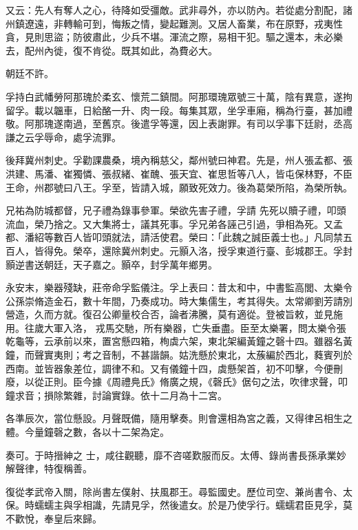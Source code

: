 \begin{pinyinscope}
 又云：先人有奪人之心，待降如受彊敵。武非尋外，亦以防內。若從處分割配，諸州鎮遼遠，非轉輸可到，悔叛之情，變起難測。又居人畜業，布在原野，戎夷性貪，見則思盜；防彼肅此，少兵不堪。渾流之際，易相干犯。驅之還本，未必樂去，配州內徙，復不肯從。既其如此，為費必大。



 朝廷不許。



 孚持白武幡勞阿那瑰於柔玄、懷荒二鎮間。阿那環瑰眾號三十萬，陰有異意，遂拘留孚。載以韞車，日給酪一升、肉一段。每集其眾，坐孚車廂，稱為行臺，甚加禮敬。阿那瑰遂南過，至舊京。後遣孚等還，因上表謝罪。有司以孚事下廷尉，丞高謙之云孚辱命，處孚流罪。



 後拜冀州刺史。孚勸課農桑，境內稱慈父，鄰州號曰神君。先是，州人張孟都、張洪建、馬潘、崔獨憐、張叔緒、崔醜、張天宜、崔思哲等八人，皆屯保林野，不臣王命，州郡號曰八王。孚至，皆請入城，願致死效力。後為葛榮所陷，為榮所執。



 兄祐為防城都督，兄子禮為錄事參軍。榮欲先害子禮，孚請
 先死以贖子禮，叩頭流血，榮乃捨之。又大集將士，議其死事。孚兄弟各誣己引過，爭相為死。又孟都、潘紹等數百人皆叩頭就法，請活使君。榮曰：「此魏之誠臣義士也。」凡同禁五百人，皆得免。榮卒，還除冀州刺史。元顥入洛，授孚東道行臺、彭城郡王。孚封顥逆書送朝廷，天子嘉之。顥卒，封孚萬年鄉男。



 永安末，樂器殘缺，莊帝命孚監儀注。孚上表曰：昔太和中，中書監高閭、太樂令公孫崇脩造金石，數十年間，乃奏成功。時大集儒生，考其得失。太常卿劉芳請別營造，久而方就。復召公卿量校合否，論者沸騰，莫有適從。登被旨敕，並見施用。往歲大軍入洛，
 戎馬交馳，所有樂器，亡失垂盡。臣至太樂署，問太樂令張乾龜等，云承前以來，置宮懸四箱，栒虡六架，東北架編黃鐘之磬十四。雖器名黃鐘，而聲實夷則；考之音制，不甚諧韻。姑洗懸於東北，太蔟編於西北，蕤賓列於西南。並皆器象差位，調律不和。又有儀鐘十四，虡懸架首，初不叩擊，今便刪廢，以從正則。臣今據《周禮鳧氏》脩廣之規，《磬氏》倨句之法，吹律求聲，叩鐘求音；損除繁雜，討論實錄。依十二月為十二宮。



 各準辰次，當位懸設。月聲既備，隨用擊奏。則會還相為宮之義，又得律呂相生之體。今量鐘磬之數，各以十二架為定。



 奏可。于時搢紳之
 士，咸往觀聽，靡不咨嗟歎服而反。太傅、錄尚書長孫承業妙解聲律，特復稱善。



 復從孝武帝入關，除尚書左僕射、扶風郡王。尋監國史。歷位司空、兼尚書令、太保。時蠕蠕主與孚相識，先請見孚，然後遣女。於是乃使孚行。蠕蠕君臣見孚，莫不歡悅，奉皇后來歸。




\end{pinyinscope}
